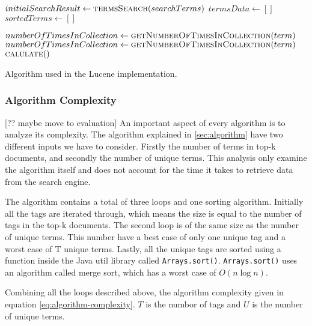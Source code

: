 \begin{algorithm}
  \begin{algorithmic}
    \State $initialSearchResult \gets \Call{termsSearch}{searchTerms}$
    \State $termsData \gets [ ]$
    \State $sortedTerms \gets [ ]$

        \State $numberOfTimesInCollection \gets \Call{getNumberOfTimesInCollection}{term}$
        \State $numberOfTimesInCollection \gets \Call{getNumberOfTimesInCollection}{term}$
        \State {}
      \EndFor
    \EndFor
      \State $\Call{calulate}$
    \EndFor

  \end{algorithmic}
  \caption{Algorithm used in the Lucene implementation.}
\end{algorithm}

\subsubsection{Algorithm Complexity}
[?? maybe move to evaluation]
An important aspect of every algorithm is to analyze its complexity.
The algorithm explained in \ref{sec:algorithm} have two different inputs we have to consider.
Firstly the number of terms in top-k documents, and secondly the number of unique terms.
This analysis only examine the algorithm itself and does not account for the time it takes to retrieve data from the search engine.

The algorithm contains a total of three loops and one sorting algorithm.
Initially all the tags are iterated through,
which means the size is equal to the number of tags in the top-k documents.
The second loop is of the same size as the number of unique terms.
This number have a best case of only one unique tag and a worst case of T unique terms.
Lastly, all the unique tags are sorted using a function inside the Java util library called \texttt{Arrays.sort()}.
\texttt{Arrays.sort()} uses an algorithm called merge sort,
which has a worst case of $O(n\log{}n)$.

Combining all the loops described above, the algorithm complexity  given in equation \ref{eq:algorithm-complexity}.
$T$ is the numbor of tags and $U$ is the number of unique terms.

